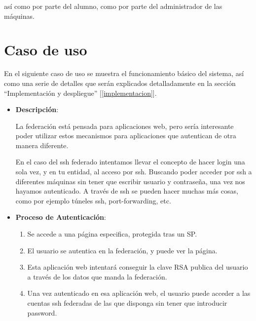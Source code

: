 así como por parte del alumno, como por
parte del administrador de las máquinas.

\newpage
\section{Caso de uso}

    En el siguiente caso de uso se muestra el funcionamiento básico del
    sistema, así como una serie de detalles que serán explicados
    detalladamente en la sección ``Implementación y despliegue''
    [\ref{implementacion}].


    \begin{itemize}

    \item \textbf{Descripción}:
    
    La federación está pensada para aplicaciones web, pero sería
    interesante poder utilizar estos mecanismos para aplicaciones que
    autentican de otra manera diferente.

    En el caso del ssh federado intentamos llevar el concepto de hacer
    login una sola vez, y en tu entidad, al acceso por ssh. Buscando poder
    acceder por ssh a diferentes máquinas sin tener que escribir usuario y
    contraseña, una vez nos hayamos autenticado.  A través de ssh se pueden
    hacer muchas más cosas, como por ejemplo túneles ssh, port-forwarding,
    etc.

    \item \textbf{Proceso de Autenticación}:
    \label{casouso}

    \begin{enumerate}

        \item Se accede a una página especifica, protegida tras un SP.

        \item El usuario se autentica en la federación, y puede ver la
        página.

        \item Esta aplicación web intentará conseguir la clave RSA publica
        del usuario a través de los datos que manda la federación.

        \item Una vez autenticado en esa aplicación web, el usuario puede
        acceder a las cuentas ssh federadas de las que disponga sin tener
        que introducir password.


\end{enumerate}
\end{itemize}
